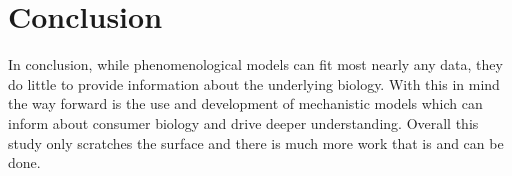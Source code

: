 \documentclass[a4paper]{article}
\numberwithin{equation}{section}
\begin{document}
\section{Conclusion}
In conclusion, while phenomenological models can fit most nearly any data, they do little to provide information about the underlying biology.  With this in mind the way forward is the use and development of mechanistic models which can inform about consumer biology and drive deeper understanding.
Overall this study only scratches the surface and there is much more work that is and can be done.



\newpage
\appendix{}







\end{document}
